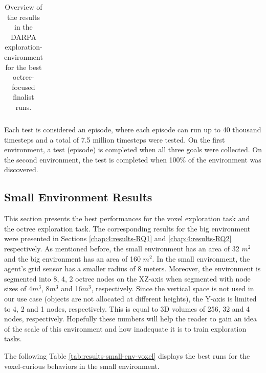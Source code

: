 \begin{longtable}{|l|c|c|c|c|}
    \caption{Overview of the results in the DARPA exploration-environment for the best octree-focused finalist runs.}
    \label{tab:results-evaluation-framework}
\end{longtable}
Each test is considered an episode, where each episode can run up to 40 thousand timesteps and a total of 7.5 million timesteps were tested. On the first environment, a test (episode) is completed when all three goals were collected. On the second environment, the test is completed when 100\% of the environment was discovered.



\newpage
\subsection{Small Environment Results}\label{chap-4:small-env-results}
This section presents the best performances for the voxel exploration task and the octree exploration task. The corresponding results for the big environment were presented in Sections \ref{chap:4:results-RQ1} and \ref{chap:4:results-RQ2} respectively. As mentioned before, the small environment has an area of 32 $m^2$ and the big environment has an area of 160 $m^2$. 
In the small environment, the agent's grid sensor has a smaller radius of 8 meters. Moreover, the environment is segmented into 8, 4, 2 octree nodes on the XZ-axis when segmented with node sizes of 4$m^3$, 8$m^3$ and 16$m^3$, respectively. Since the vertical space is not used in our use case (objects are not allocated at different heights), the Y-axis is limited to 4, 2 and 1 nodes, respectively. This is equal to 3D volumes of 256, 32 and 4 nodes, respectively. Hopefully these numbers will help the reader to gain an idea of the scale of this environment and how inadequate it is to train exploration tasks.

The following Table \ref{tab:results-small-env-voxel} displays the best runs for the voxel-curious behaviors in the small environment.

